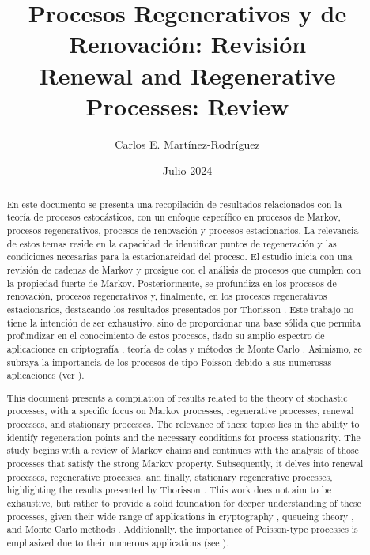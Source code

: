 \documentclass{article}
\title{Procesos Regenerativos y de Renovación: Revisión\\
\small{Renewal and Regenerative Processes: Review}}
\author{Carlos E. Martínez-Rodríguez}
\date{Julio 2024}
\renewcommand{\abstractname}{Resumen}
\numberwithin{equation}{section}
\begin{document}
\maketitle

\begin{abstract}
En este documento se presenta una recopilación de resultados relacionados con la teoría de procesos estocásticos, con un enfoque específico en procesos de Markov, procesos regenerativos, procesos de renovación y procesos estacionarios. La relevancia de estos temas reside en la capacidad de identificar puntos de regeneración y las condiciones necesarias para la estacionareidad del proceso. El estudio inicia con una revisión de cadenas de Markov y prosigue con el análisis de procesos que cumplen con la propiedad fuerte de Markov. Posteriormente, se profundiza en los procesos de renovación, procesos regenerativos y, finalmente, en los procesos regenerativos estacionarios, destacando los resultados presentados por Thorisson \cite{Thorisson}. Este trabajo no tiene la intención de ser exhaustivo, sino de proporcionar una base sólida que permita profundizar en el conocimiento de estos procesos, dado su amplio espectro de aplicaciones en criptografía \cite{Portman}, teoría de colas \cite{Morozov} y métodos de Monte Carlo \cite{Xu}. Asimismo, se subraya la importancia de los procesos de tipo Poisson debido a sus numerosas aplicaciones (ver \cite{Douc}).
\end{abstract}

\begin{otherlanguage}{english}
\renewcommand{\abstractname}{Abstract} %
\begin{abstract}
This document presents a compilation of results related to the theory of stochastic processes, with a specific focus on Markov processes, regenerative processes, renewal processes, and stationary processes. The relevance of these topics lies in the ability to identify regeneration points and the necessary conditions for process stationarity. The study begins with a review of Markov chains and continues with the analysis of those processes that satisfy the strong Markov property. Subsequently, it delves into renewal processes, regenerative processes, and finally, stationary regenerative processes, highlighting the results presented by Thorisson \cite{Thorisson}. This work does not aim to be exhaustive, but rather to provide a solid foundation for deeper understanding of these processes, given their wide range of applications in cryptography \cite{Portman}, queueing theory \cite{Morozov}, and Monte Carlo methods \cite{Xu}. Additionally, the importance of Poisson-type processes is emphasized due to their numerous applications (see \cite{Douc}).
\end{abstract}
\end{otherlanguage}
\end{document}
